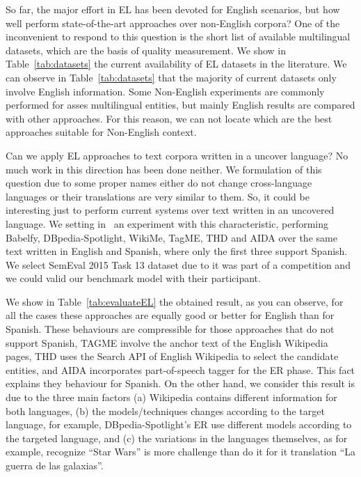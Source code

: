 \documentclass[sigconf]{acmart}
\begin{document}
So far, the major effort in EL has been devoted for English scenarios, but how well perform state-of-the-art approaches over non-English corpora? One of the inconvenient to respond to this question is the short list of available multilingual datasets, which are the basis of quality measurement. We show in Table~\ref{tab:datasets} the current availability of EL datasets in the literature. We can observe in Table~\ref{tab:datasets} that the majority of current datasets only involve English information. Some Non-English experiments are commonly performed for asses multilingual entities, but mainly English results are compared with other approaches. For this reason, we can not locate which are the best approaches suitable for Non-English context.  

Can we apply EL approaches to text corpora written in a uncover language? No much work in this direction has been done neither. We formulation of this question due to some proper names either do not change cross-language languages or their translations are very similar to them. So, it could be interesting just to perform current systems over text written in an uncovered language. We setting in~\cite{Rosales-MendezP17} an experiment with this characteristic, performing Babelfy, DBpedia-Spotlight, WikiMe, TagME, THD and AIDA over the same text written in English and Spanish, where only the first three support Spanish. We select SemEval 2015  Task 13 dataset due to it was part of a competition and we could valid our benchmark model with their participant. 

We show in Table~\ref{tab:evaluateEL} the obtained result, as you can observe, for all the cases these approaches are equally good or better for English than for Spanish. These behaviours are compressible for those approaches that do not support Spanish, TAGME involve the anchor text of the English Wikipedia pages, THD uses the Search API of English Wikipedia to select the candidate entities, and AIDA incorporates part-of-speech tagger for the ER phase. This fact explains they behaviour for Spanish. On the other hand, we consider this result is due to the three main factors (a) Wikipedia contains different information for both languages, (b) the models/techniques changes according to the target language, for example, DBpedia-Spotlight's ER use different models according to the targeted language, and (c) the variations in the languages themselves, as for example, recognize ``Star Wars'' is more challenge than do it for it translation ``La guerra de las galaxias''. 
\end{document}
